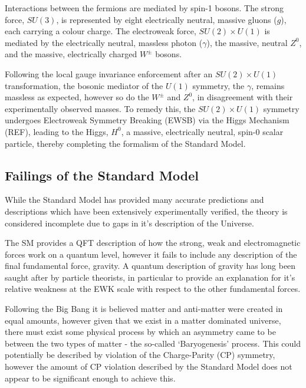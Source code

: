 Interactions between the fermions are mediated by spin-1 bosons. The strong 
force, $SU(3)$, is represented by eight electrically neutral, massive gluons 
($g$), each carrying a colour charge. The electroweak force, $SU(2)\times U(1)$
is
mediated by the electrically neutral, massless photon ($\gamma$), the massive,
neutral $Z^0$, and the massive, electrically charged $W^{\pm}$ bosons.

Following the local gauge invariance enforcement after an $SU(2)\times U(1)$
transformation,
the bosonic mediator of the $U(1)$ symmetry, the $\gamma$, remains massless as
expected, however so do the $W^{\pm}$ and $Z^0$, in disagreement with their
experimentally observed masses. To remedy this, the $SU(2)\times U(1)$ symmetry
undergoes Electroweak Symmetry Breaking (EWSB) via the Higgs Mechanism (REF), 
leading to the Higgs, $H^0$, a massive, electrically neutral, spin-0
scalar particle, thereby completing the formalism of the Standard Model.



\subsection{Failings of the Standard Model}

While the Standard Model has provided many accurate predictions and descriptions
which have been extensively experimentally verified, the theory is considered
incomplete due to gaps in it's description of the Universe.

The SM provides a QFT description of how the strong, weak and electromagnetic
forces work on a quantum level, however it fails to include any description of
the final fundamental force, gravity. A quantum description of gravity has long
been saught after by particle theorists, in particular to provide an explanation
for it's relative weakness at the EWK scale with respect to the other
fundamental forces.

Following the Big Bang it is believed matter and anti-matter were created in
equal amounts, however given that we exist in a matter dominated universe, there
must exist some physical process by which an asymmetry came to be between the
two types of matter - the so-called `Baryogenesis' process. This could
potentially be described by violation of the Charge-Parity (CP) symmetry,
however the amount of CP violation described by the Standard Model
does not appear to be significant enough to achieve this.

